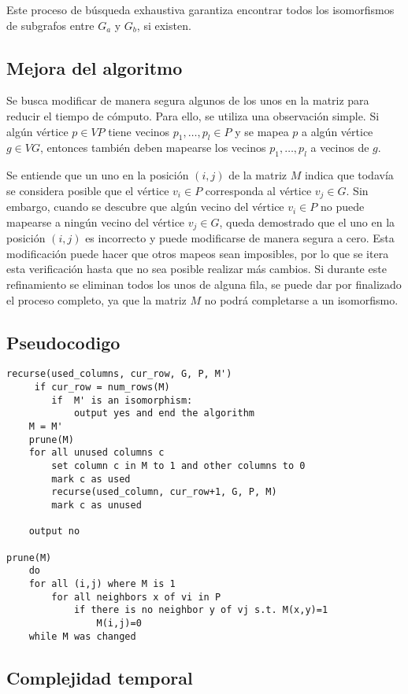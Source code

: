 \documentclass[12pt,a4paper]{article}
\begin{document}
Este proceso de búsqueda exhaustiva garantiza encontrar todos los isomorfismos de subgrafos entre \(G_a\) y \(G_b\), si existen.

\subsection{Mejora del algoritmo}
Se busca modificar de manera segura algunos de los unos en la matriz para reducir el tiempo de cómputo. Para ello, se utiliza una observación simple. Si algún vértice $p \in VP$ tiene vecinos $p_1,\ldots,p_l \in P$ y se mapea $p$ a algún vértice $g \in VG$, entonces también deben mapearse los vecinos $p_1,\ldots,p_l$ a vecinos de $g$.

Se entiende que un uno en la posición $(i,j)$ de la matriz $M$ indica que todavía se considera posible que el vértice $v_i \in P$ corresponda al vértice $v_j \in G$. Sin embargo, cuando se descubre que algún vecino del vértice $v_i \in P$ no puede mapearse a ningún vecino del vértice $v_j \in G$, queda demostrado que el uno en la posición $(i,j)$ es incorrecto y puede modificarse de manera segura a cero. Esta modificación puede hacer que otros mapeos sean imposibles, por lo que se itera esta verificación hasta que no sea posible realizar más cambios. Si durante este refinamiento se eliminan todos los unos de alguna fila, se puede dar por finalizado el proceso completo, ya que la matriz $M$ no podrá completarse a un isomorfismo.
\\
\subsection{Pseudocodigo}
\begin{verbatim}
recurse(used_columns, cur_row, G, P, M')
     if cur_row = num_rows(M)
        if  M' is an isomorphism:
            output yes and end the algorithm
    M = M'
    prune(M) 
    for all unused columns c
        set column c in M to 1 and other columns to 0
        mark c as used
        recurse(used_column, cur_row+1, G, P, M)
        mark c as unused

    output no

prune(M)
    do
    for all (i,j) where M is 1
        for all neighbors x of vi in P
            if there is no neighbor y of vj s.t. M(x,y)=1
                M(i,j)=0
    while M was changed
\end{verbatim}
\subsection{Complejidad temporal}
\end{document}
